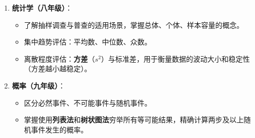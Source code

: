\documentclass[11pt,a4paper]{ctexart}
\begin{document}
\begin{enumerate}[label=\textbf{\thesection.\arabic*}]
    \item \textbf{统计学（八年级）}：
    \begin{itemize}
        \item 了解抽样调查与普查的适用场景，掌握总体、个体、样本容量的概念。
        \item 集中趋势评估：平均数、中位数、众数。
        \item 离散程度评估：\textbf{方差}（$s^2$）与标准差，用于衡量数据的波动大小和稳定性（方差越小越稳定）。
    \end{itemize}
    
    \item \textbf{概率（九年级）}：
    \begin{itemize}
        \item 区分必然事件、不可能事件与随机事件。
        \item 掌握使用\textbf{列表法}和\textbf{树状图法}穷举所有等可能结果，精确计算两步及以上随机事件发生的概率。
    \end{itemize}
\end{enumerate}
\end{document}
